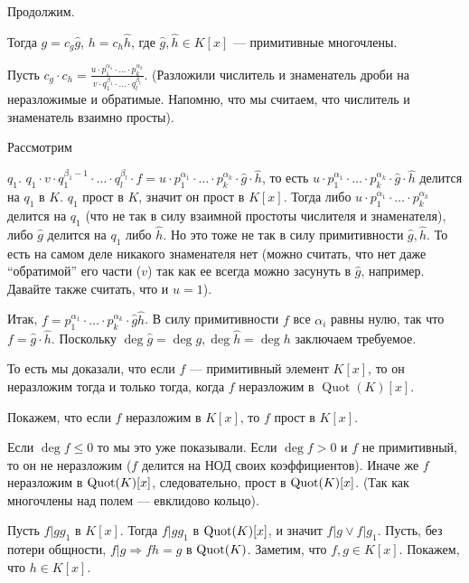 \documentclass[../main.tex]{subfiles}
\begin{document}
    Продолжим.

    Тогда $g = c_g \hat{g}$,
    $h = c_h \hat{h}$, где $\hat{g}, \hat{h} \in K[x]$ ---
    примитивные многочлены.

    Пусть $c_g \cdot c_h
    = \frac{u \cdot p_1^{\alpha_1} \cdot \ldots \cdot p_k^{\alpha_k}}
    {v \cdot q_1^{\beta_1} \cdot \ldots \cdot q_l^{\beta_l}}$.
    (Разложили числитель и знаменатель дроби на неразложимые и обратимые.
    Напомню, что мы считаем, что числитель и знаменатель взаимно просты).

    \hypertarget{9.3.no.denominator}{Рассмотрим} $q_1$.
    $q_1 \cdot v \cdot q_1^{\beta_1 - 1} \cdot \ldots \cdot q_l^{\beta_l}
    \cdot f
    = u \cdot p_1^{\alpha_1} \cdot \ldots \cdot p_k^{\alpha_k}
    \cdot \hat{g} \cdot \hat{h}$, то есть
    $u \cdot p_1^{\alpha_1} \cdot \ldots \cdot p_k^{\alpha_k}
    \cdot \hat{g} \cdot \hat{h}$ делится на $q_1$ в $K$. $q_1$ прост в $K$,
    значит он прост в $K[x]$.  Тогда либо
    $u \cdot p_1^{\alpha_1} \cdot \ldots \cdot p_k^{\alpha_k}$ делится на $q_1$
    (что не так в силу взаимной простоты числителя и знаменателя), либо
    $\hat{g}$ делится на $q_1$ либо $\hat{h}$. Но это тоже не так в силу
    примитивности $\hat{g}, \hat{h}$. То есть на самом деле никакого
    знаменателя нет (можно считать, что нет даже ``обратимой'' его части ($v$)
    так как ее всегда можно засунуть в $\hat{g}$, например. Давайте также
    считать, что и $u = 1$).

    Итак, $f = p_1^{\alpha_1} \cdot \ldots \cdot p_k^{\alpha_k} \cdot
    \hat{g} \hat{h}$. В силу примитивности $f$ все $\alpha_i$ равны нулю, так
    что $f = \hat{g} \cdot \hat{h}$. Поскольку $\deg \hat{g} = \deg g,
    \deg \hat{h} = \deg h$ заключаем требуемое.

    То есть мы доказали, что если $f$ --- примитивный элемент $K[x]$, то он
    неразложим тогда и только тогда, когда $f$ неразложим в
    $\operatorname{Quot}(K)[x]$.

    Покажем, что если $f$ неразложим в $K[x]$, то $f$ прост в $K[x]$.

    Если $\deg f \leqslant 0$ то мы это уже показывали. Если $\deg f > 0$ и
    $f$ не примитивный, то он не неразложим ($f$ делится на НОД своих
    коэффициентов). Иначе же $f$ неразложим в $\operatorname{Quot}(K)[x]$, следовательно,
    прост в $\operatorname{Quot}(K)[x]$. (Так как многочлены над полем --- евклидово кольцо).

    Пусть $f | gg_1$ в $K[x]$. Тогда $f | gg_1$ в $\operatorname{Quot}(K)[x]$, и значит
    $f | g \lor f | g_1$. Пусть, без потери общности, $f | g \Rightarrow
    fh = g$ в $\operatorname{Quot}(K)$. Заметим, что $f, g \in K[x]$. Покажем, что
    $h \in K[x]$.
\end{document}
